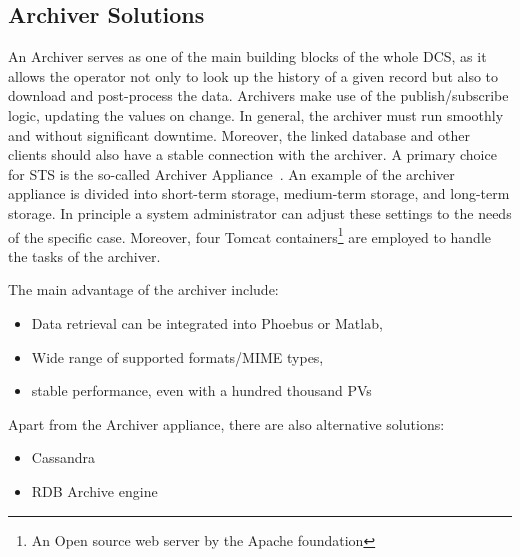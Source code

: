 \subsection{Archiver Solutions} \label{archiver}
An Archiver serves as one of the main building blocks of the whole \gls{DCS}, as it allows the operator not only to look up the history of a given record but also to download and post-process the data. Archivers make use of the publish/subscribe logic, updating the values on change. In general, the archiver must run smoothly and without significant downtime. Moreover, the linked database and other clients should also have a stable connection with the archiver. A primary choice for STS is the so-called Archiver Appliance~\cite{archiver_appliance}. An example of the archiver appliance is divided into short-term storage, medium-term storage, and long-term storage. In principle a system administrator can adjust these settings to the needs of the specific case. Moreover, four Tomcat containers\footnote[1]{An Open source web server by the Apache foundation} are employed to handle the tasks of the archiver.  

The main advantage of the archiver include: 

\begin{itemize}
    \item Data retrieval can be integrated into Phoebus or Matlab,
    \item Wide range of supported formats/MIME types,
    \item stable performance, even with a hundred thousand \gls{PV}s
\end{itemize}
Apart from the Archiver appliance, there are also alternative solutions:

\begin{itemize}
    \item Cassandra \cite{cassandra_archive}
    \item RDB Archive engine \cite{rdb_archive}
\end{itemize}

